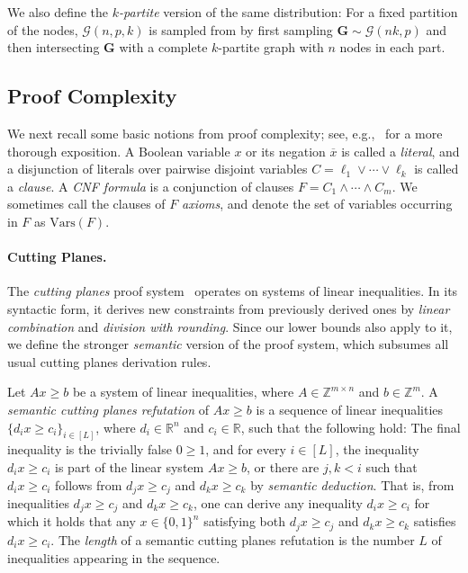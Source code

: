 \documentclass[10pt,a4paper]{article}
\theoremstyle{definition}
\theoremstyle{remark}
\theoremstyle{example}
\theoremstyle{plain}
\newcommand{\Z}{\mathbb{Z}}
\newcommand{\R}{\mathbb{R}}
\newcommand{\calG}{\mathcal{G}}
\newcommand{\prflength}{L}
\newcommand{\myparagraph}[1]{\paragraph{#1}}
\begin{document}
 We also define the \emph{$k$-partite} version of the same distribution: For a fixed partition of the nodes, $\calG(n, p, k)$ is sampled from by first sampling $\bm G \sim \calG(nk, p)$ and then intersecting $\bm G$ with a complete $k$-partite graph with $n$ nodes in each part. 

\subsection{Proof Complexity}
We next recall some basic notions from proof complexity; see, e.g.,~\cite{Krajicek19ProofComplexity,BN21ProofCplxSAT} for a more thorough exposition.  
A Boolean variable $x$ or its negation $\overline{x}$ is called a \emph{literal},
and a disjunction of literals over pairwise disjoint variables $C= \ell_1 \lor \cdots \lor \ell_k$ is called a \emph{clause}.
A \emph{CNF formula} is a conjunction of clauses $F = C_1 \land \cdots \land C_m$. 
We sometimes call the clauses of $F$ \emph{axioms}, and denote the set of variables occurring in $F$ as $\textrm{Vars}(F)$.

\myparagraph{Cutting Planes.}
The \emph{cutting planes} proof system~\cite{CCT87ComplexityCP} operates on systems of linear inequalities. In its syntactic form, it derives new constraints from previously derived ones by \emph{linear combination} and \emph{division with rounding}. Since our lower bounds also apply to it, we define the stronger \emph{semantic} version of the proof system, which subsumes all usual cutting planes derivation rules. 

Let $Ax\geq b$ be a system of linear inequalities, where $A\in \Z^{m\times n}$ and $b\in \Z^m$.
A \emph{semantic cutting planes refutation} of $Ax\geq b$ is a sequence of linear inequalities 
$\{d_i x\geq c_i\}_{i\in [\prflength]}$, 
where $d_i \in \R^n$ and $c_i\in \R$, such that the following hold: The final inequality is the trivially false $0\geq 1$, and
for every $i \in [\prflength]$, the inequality $d_i x\geq c_i$ is part of the linear system $Ax\geq b$, or there are $j,k<i$ such that $d_i x\geq c_i$ follows from $d_j x\geq c_j$ and $d_k x\geq c_k$ by \emph{semantic deduction}. 
That is, from inequalities $d_j x\geq c_j$ and $d_k x\geq c_k$, one can derive any inequality $d_i x\geq c_i$ for which it holds that any $x \in \{0,1\}^n$ satisfying both $d_j x\geq c_j$ and $d_k x\geq c_k$ satisfies $d_i x\geq c_i$.
The \emph{length} of a semantic cutting planes refutation is the number $\prflength$ of inequalities appearing in the sequence.
\end{document}
